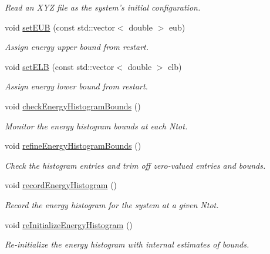 \begin{DoxyCompactItemize}
\begin{DoxyCompactList}\small\item\em Read an X\-Y\-Z file as the system's initial configuration. \end{DoxyCompactList}\item 
void \hyperlink{classsim_system_ab894de5ccd37efa97ae799f1dc1875a1}{set\-E\-U\-B} (const std\-::vector$<$ double $>$ eub)
\begin{DoxyCompactList}\small\item\em Assign energy upper bound from restart. \end{DoxyCompactList}\item 
void \hyperlink{classsim_system_a284cf6c00f572db12db0cb263974a78a}{set\-E\-L\-B} (const std\-::vector$<$ double $>$ elb)
\begin{DoxyCompactList}\small\item\em Assign energy lower bound from restart. \end{DoxyCompactList}\item 
void \hyperlink{classsim_system_a176b9ff482f1d36bc0638538bcfe0670}{check\-Energy\-Histogram\-Bounds} ()
\begin{DoxyCompactList}\small\item\em Monitor the energy histogram bounds at each Ntot. \end{DoxyCompactList}\item 
void \hyperlink{classsim_system_afe05cba714a032b445cfb1a529547833}{refine\-Energy\-Histogram\-Bounds} ()
\begin{DoxyCompactList}\small\item\em Check the histogram entries and trim off zero-\/valued entries and bounds. \end{DoxyCompactList}\item 
void \hyperlink{classsim_system_aa0eae4d523b5649be273e0419e9f799f}{record\-Energy\-Histogram} ()
\begin{DoxyCompactList}\small\item\em Record the energy histogram for the system at a given Ntot. \end{DoxyCompactList}\item 
void \hyperlink{classsim_system_a861dd81718ef1c069fa7cfb9b7efe83c}{re\-Initialize\-Energy\-Histogram} ()
\begin{DoxyCompactList}\small\item\em Re-\/initialize the energy histogram with internal estimates of bounds. \end{DoxyCompactList}\item 

\end{DoxyCompactItemize}
